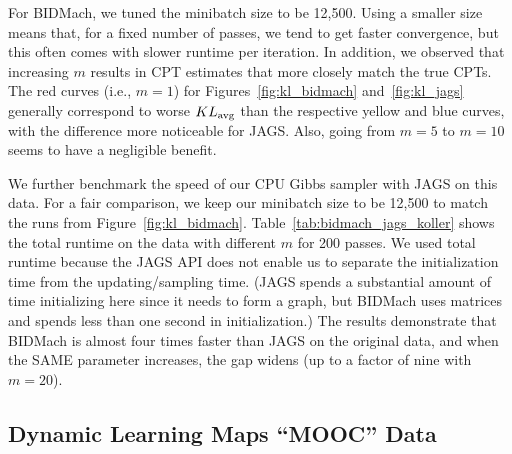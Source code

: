 \documentclass{article} %
\begin{document}
For BIDMach, we tuned the minibatch size to be 12,500. Using a smaller size means that, for a fixed
number of passes, we tend to get faster convergence, but this often comes with slower runtime per
iteration. In addition, we observed that increasing $m$ results in CPT estimates that more closely
match the true CPTs. The red curves (i.e., $m=1$) for Figures~\ref{fig:kl_bidmach}
and~\ref{fig:kl_jags} generally correspond to worse $KL_{\rm avg}$ than the respective yellow and
blue curves, with the difference more noticeable for JAGS. Also, going from $m=5$ to $m=10$ seems to
have a negligible benefit.

We further benchmark the speed of our CPU Gibbs sampler with JAGS on this data. For a fair
comparison, we keep our minibatch size to be 12,500 to match the runs from
Figure~\ref{fig:kl_bidmach}.  Table~\ref{tab:bidmach_jags_koller} shows the total runtime on the
data with different $m$ for 200 passes. We used total runtime because the JAGS API does not enable
us to separate the initialization time from the updating/sampling time. (JAGS spends a substantial
amount of time initializing here since it needs to form a graph, but BIDMach uses matrices and
spends less than one second in initialization.) The results demonstrate that BIDMach is almost four
times faster than JAGS on the original data, and when the SAME parameter increases, the gap widens
(up to a factor of nine with $m=20$).




\subsection{Dynamic Learning Maps ``MOOC'' Data}\label{ssec:mooc_data}
\end{document}
